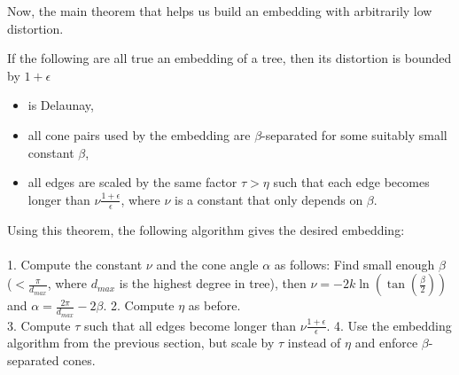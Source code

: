 Now, the main theorem that helps us build an embedding with arbitrarily low distortion.

\begin{theorem}
If the following are all true an embedding of a tree, then its distortion is bounded by $1 + \epsilon$
\begin{itemize}
    \item is Delaunay,
    \item all cone pairs used by the embedding are $\beta$-separated for some suitably small constant $\beta$,
    \item all edges are scaled by the same factor $\tau > \eta$ such that each edge becomes longer than $\nu\frac{1+\epsilon}{\epsilon}$, where $\nu$ is a constant that only depends on $\beta$.
\end{itemize}
\end{theorem}

Using this theorem, the following algorithm gives the desired embedding: \\
\horrule{0.5pt} \\
1. Compute the constant $\nu$ and the cone angle $\alpha$ as follows: Find small enough $\beta$ ($< \frac{\pi}{d_{max}}$, where $d_{max}$ is the highest degree in tree), then $\nu = -2k\ln(\tan(\frac{\beta}{2}))$ and $\alpha = \frac{2\pi}{d_{max}} - 2\beta$.
2. Compute $\eta$ as before. \\
3. Compute $\tau$ such that all edges become longer than $\nu\frac{1+\epsilon}{\epsilon}$.
4. Use the embedding algorithm from the previous section, but scale by  $\tau$ instead of $\eta$ and enforce $\beta$-separated cones.\\
\horrule{0.5pt} \\